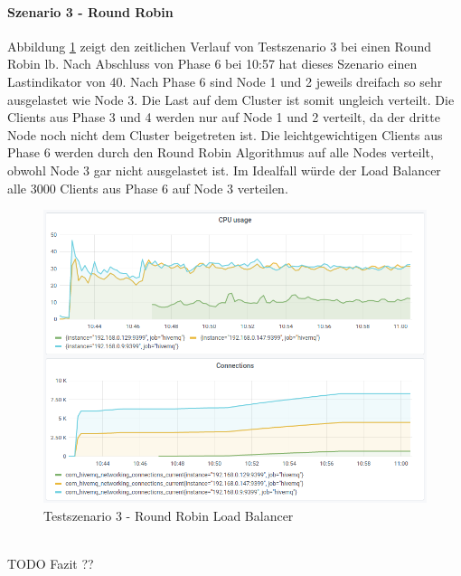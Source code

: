 \paragraph{Szenario 3 - Round Robin}
Abbildung \ref{fig:s3-rr} zeigt den zeitlichen Verlauf von Testszenario 3 bei einen Round Robin \ac{lb}.
Nach Abschluss von Phase 6 bei 10:57 hat dieses Szenario einen Lastindikator von 40.
Nach Phase 6 sind Node 1 und 2 jeweils dreifach so sehr ausgelastet wie Node 3. Die Last auf dem Cluster ist somit ungleich verteilt. Die Clients aus Phase 3 und 4 werden nur auf Node 1 und 2 verteilt, da der dritte Node noch nicht dem Cluster beigetreten ist. Die leichtgewichtigen Clients aus Phase 6 werden durch den Round Robin Algorithmus auf alle Nodes verteilt, obwohl Node 3 gar nicht ausgelastet ist. Im Idealfall würde der Load Balancer alle 3000 Clients aus Phase 6 auf Node 3 verteilen.
\begin{figure}
    \centering
    \includegraphics[scale=0.8]{images/s3_rr.png}
    \caption{Testszenario 3 - Round Robin Load Balancer}
    \label{fig:s3-rr}
\end{figure}
\\
TODO Fazit ??

